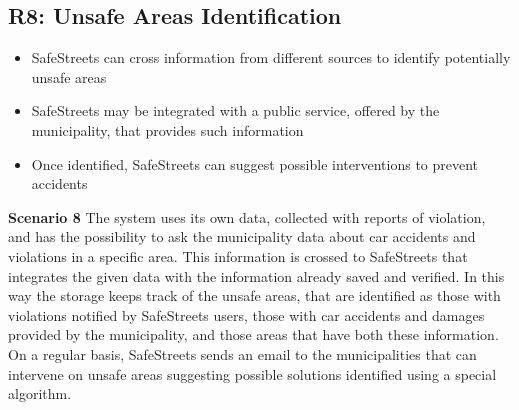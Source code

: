 \subsection{R8: Unsafe Areas Identification}
\begin{itemize}
  \item SafeStreets can cross information from different sources to identify potentially unsafe areas
  \item SafeStreets may be integrated with a public service, offered by the municipality, that provides such information
  \item Once identified, SafeStreets can suggest possible interventions to prevent accidents
\end{itemize}
\begin{description}
    \item \textbf{Scenario 8} \newline
        The system uses its own data, collected with reports of violation, and has the possibility to ask the municipality data about car 
        accidents and violations in a specific area. This information is crossed to SafeStreets that integrates the given data with the information
        already saved and verified. In this way the storage keeps track of the unsafe areas, that are identified as those with violations notified
        by SafeStreets users, those with car accidents and damages provided by the municipality, and those areas that have both these 
        information. On a regular basis, SafeStreets sends an email to the municipalities that can intervene on unsafe areas suggesting possible solutions identified using a special algorithm.
        

\end{description}
